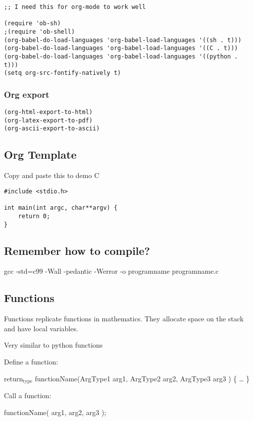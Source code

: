 \documentclass[11pt]{article}
\begin{document}
\begin{verbatim}
;; I need this for org-mode to work well

(require 'ob-sh)
;(require 'ob-shell)
(org-babel-do-load-languages 'org-babel-load-languages '((sh . t)))
(org-babel-do-load-languages 'org-babel-load-languages '((C . t)))
(org-babel-do-load-languages 'org-babel-load-languages '((python . t)))
(setq org-src-fontify-natively t)
\end{verbatim}

\subsubsection{Org export}
\label{sec:orgcabf44d}
\begin{verbatim}
(org-html-export-to-html)
(org-latex-export-to-pdf)
(org-ascii-export-to-ascii)
\end{verbatim}


\subsection{Org Template}
\label{sec:org09a5ccc}
Copy and paste this to demo C

\begin{verbatim}
#include <stdio.h>

int main(int argc, char**argv) {
    return 0;
}
\end{verbatim}

\subsection{Remember how to compile?}
\label{sec:org3050ba6}

gcc -std=c99 -Wall -pedantic -Werror -o programname programname.c

\subsection{Functions}
\label{sec:org90f3e3d}

Functions replicate functions in mathematics. They allocate space on
the stack and have local variables.

Very similar to python functions

Define a function:

return\(_{\text{type}}\) functionName(ArgType1 arg1, ArgType2 arg2, ArgType3 arg3 ) \{
    \ldots{}
\}

Call a function:

functionName( arg1, arg2, arg3 );
\end{document}
